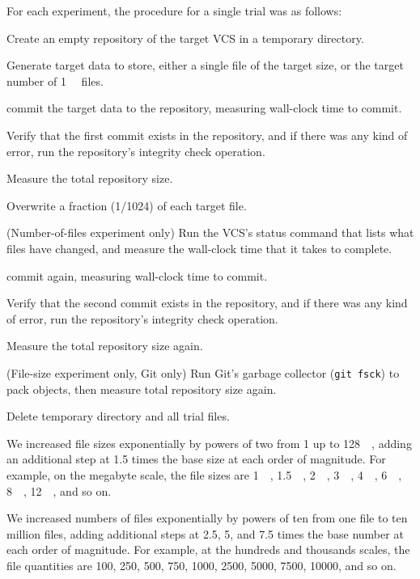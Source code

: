 For each experiment, the procedure for a single trial was as follows:
\begin{tight_enumerate}
    \item Create an empty \gls{repository} of the target \gls{VCS} in a temporary directory.
    \item Generate target data to store, either a single file of the target size, or the target number of \SI{1}{\kibi\byte} files.
    \item \Gls{commit} the target data to the \gls{repository}, measuring wall-clock time to \gls{commit}.
    \item Verify that the first \gls{commit} exists in the \gls{repository}, and if there was any kind of error, run the \gls{repository}'s integrity check operation.
    \item Measure the total \gls{repository} size.
    \item Overwrite a fraction (\num{1/1024}) of each target file.
    \item (Number-of-files experiment only) Run the \gls{VCS}'s status command that lists what files have changed, and measure the wall-clock time that it takes to complete.
    \item \Gls{commit} again, measuring wall-clock time to \gls{commit}.
    \item Verify that the second \gls{commit} exists in the \gls{repository}, and if there was any kind of error, run the \gls{repository}'s integrity check operation.
    \item Measure the total \gls{repository} size again.
    \item (File-size experiment only, Git only) Run Git's garbage collector (\lstinline{git fsck}) to pack objects, then measure total \gls{repository} size again.
    \item Delete temporary directory and all trial files.
\end{tight_enumerate}

We increased file sizes exponentially by powers of two from \SI{1}{\byte} up to \SI{128}{\gibi\byte}, adding an additional step at \num{1.5} times the base size at each order of magnitude.
For example, on the megabyte scale, the file sizes are \SI{1}{\mebi\byte}, \SI{1.5}{\mebi\byte}, \SI{2}{\mebi\byte}, \SI{3}{\mebi\byte}, \SI{4}{\mebi\byte}, \SI{6}{\mebi\byte}, \SI{8}{\mebi\byte}, \SI{12}{\mebi\byte}, and so on.

We increased numbers of files exponentially by powers of ten from one file to ten million files, adding additional steps at \num{2.5}, \num{5}, and \num{7.5} times the base number at each order of magnitude.
For example, at the hundreds and thousands scales, the file quantities are \num{100}, \num{250}, \num{500}, \num{750}, \num{1000}, \num{2500}, \num{5000}, \num{7500}, \num{10000}, and so on.

